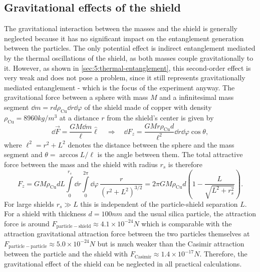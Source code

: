 \subsection{Gravitational effects of the shield}\label{subsec:5:shield-gravitation}
The gravitational interaction between the masses and the shield is generally neglected because it has no significant impact on the entanglement generation between the particles.
The only potential effect is indirect entanglement mediated by the thermal oscillations of the shield, as both masses couple gravitationally to it. 
However, as shown in \cref{sec:5:thermal-entanglement}, this second-order effect is very weak and does not pose a problem, since it still represents gravitationally mediated entanglement - which is the focus of the experiment anyway.
The gravitational force between a sphere with mass $M$ and a infinitesimal mass segment $\dd m = r d \rho_\mathrm{Cu} \dd r \dd \varphi$ of the shield made of copper with density $\rho_\mathrm{Cu} = 8960\si{kg/m^3}$ at a distance $r$ from the shield's center is given by
\begin{equation}
  \dd \vec{F} = \frac{G M \dd m}{\ell} \boldsymbol{\hat{\ell}} 
  \quad \Rightarrow \quad
  \dd F_z = \frac{G M r \rho_\mathrm{Cu} d}{\ell^2} \dd r \dd \varphi \cos \theta,
\end{equation}
where $\ell^2 = r^2 + L^2$ denotes the distance between the sphere and the mass segment and $\theta = \arccos L/\ell$ is the angle between them.
The total attractive force between the mass and the shield with radius $r_s$ is therefore
\begin{equation}
  F_z = GM \rho_\mathrm{Cu} d L \int\limits_{0}^{r_s} \dd r \int\limits_{0}^{2\pi} \dd \varphi \, \frac{r}{(r^2 + L^2)^{3/2}} = 2\pi G M \rho_\mathrm{Cu} d \left(1 - \frac{L}{\sqrt{L^2 + r_s^2}}\right) .
\end{equation}
For large shields $r_s \gg L$ this is independent of the particle-shield separation $L$.
For a shield with thickness $d = 100\si{nm}$ and the usual silica particle, the attraction force is around $F_\mathrm{particle-shield} \approx 4.1\times 10^{-24} \si{N}$ which is comparable with the attraction gravitational attraction force between the two particles themselves at $F_\mathrm{particle-particle} \approx 5.0 \times 10^{-24}\si{N}$ but is much weaker than the Casimir attraction between the particle and the shield with $F_\mathrm{Casimir} \approx 1.4 \times 10^{-17} \si{N}$.
Therefore, the gravitational effect of the shield can be neglected in all practical calculations.
